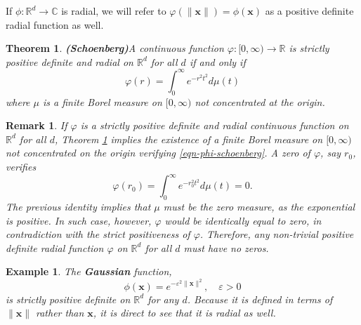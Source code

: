 \documentclass[12pt]{report} %
\newtheorem{theorem}{Theorem}
\newtheorem{example}{Example}
\newtheorem{remark}{Remark}
\newcommand{\tmmathbf}[1]{\ensuremath{\boldsymbol{#1}}}
\newcommand{\tmstrong}[1]{\textbf{#1}}
\begin{document}
If $\phi : \mathbb{R}^d \rightarrow \mathbb{C}$ is radial, we will refer to
$\varphi (\| \tmmathbf{x} \|) = \phi (\tmmathbf{x})$ as a positive definite
radial function as well.

\begin{theorem}
  {\tmstrong{(Schoenberg)}}\label{thm-schoenberg} A continuous function
  $\varphi : [0, \infty) \rightarrow \mathbb{R}$ is strictly positive definite
  and radial on $\mathbb{R}^d$ for all $d$ if and only if
  \begin{equation}
    \varphi (r) = \int_0^{\infty} e^{- r^2 t^2} d \mu (t)
    \label{eqn-phi-schoenberg}
  \end{equation}
  where $\mu$ is a finite Borel measure on $[0, \infty)$ not
  concentrated at the origin.
\end{theorem}

\begin{remark}
  If $\varphi$ is a strictly positive definite and radial continuous function
  on $\mathbb{R}^d$ for all $d$, Theorem \ref{thm-schoenberg} implies the
  existence of a finite Borel measure on $[0, \infty)$ not
  concentrated on the origin verifying \eqref{eqn-phi-schoenberg}. A zero of
  $\varphi$, say $r_0$, verifies
  \[ \varphi (r_0) = \int_0^{\infty} e^{- r_0^2 t^2} d \mu (t) = 0. \]
  The previous identity implies that $\mu$ must be the zero measure, as the
  exponential is positive. In such case, however, $\varphi$ would be
  identically equal to zero, in contradiction with the strict positiveness of
  $\varphi$. Therefore, any non-trivial positive definite radial function
  $\varphi$ on $\mathbb{R}^d$ for all $d$ must have no zeros.
\end{remark}

\begin{example}\label{ex-gaussian-strictly-positive-definite}
  The {\tmstrong{Gaussian}} function,
  \[ \phi (\tmmathbf{x}) = e^{- \varepsilon^2 \| \tmmathbf{x} \|^2}, \quad
     \varepsilon > 0 \]
  is strictly positive definite on $\mathbb{R}^d$ for any $d$. Because it is
  defined in terms of $\| \tmmathbf{x} \|$ rather than $\tmmathbf{x}$, it is
  direct to see that it is radial as well.
  
 
\end{example}
\end{document}
